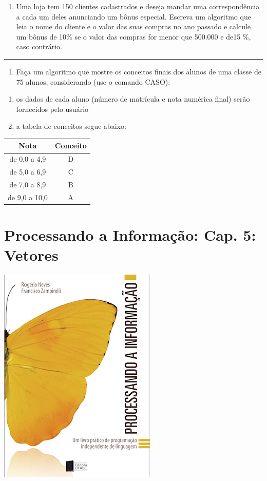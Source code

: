 \documentclass[12pt,a4paper]{article}
\providecommand{\tightlist}{%
      \setlength{\itemsep}{0pt}\setlength{\parskip}{0pt}}
\begin{document}
\begin{enumerate}
\def\labelenumi{\arabic{enumi}.}
\setcounter{enumi}{12}
\tightlist
\item
  Uma loja tem 150 clientes cadastrados e deseja mandar uma
  correspondência a cada um deles anunciando um bônus especial. Escreva
  um algoritmo que leia o nome do cliente e o valor das suas compras no
  ano passado e calcule um bônus de 10\% se o valor das compras for
  menor que 500.000 e de15 \%, caso contrário.
\end{enumerate}

    \begin{center}\rule{0.5\linewidth}{0.5pt}\end{center}

\begin{enumerate}
\def\labelenumi{\arabic{enumi}.}
\setcounter{enumi}{13}
\tightlist
\item
  Faça um algoritmo que mostre os conceitos finais dos alunos de uma
  classe de 75 alunos, considerando (use o comando CASO):
\end{enumerate}

\begin{enumerate}
\def\labelenumi{\alph{enumi})}
\item
  os dados de cada aluno (número de matrícula e nota numérica final)
  serão fornecidos pelo usuário
\item
  a tabela de conceitos segue abaixo:
\end{enumerate}

\begin{longtable}[]{@{}cc@{}}
\toprule
Nota & Conceito\tabularnewline
\midrule
\endhead
de 0,0 a 4,9 & D\tabularnewline
de 5,0 a 6,9 & C\tabularnewline
de 7,0 a 8,9 & B\tabularnewline
de 9,0 a 10,0 & A\tabularnewline
\bottomrule
\end{longtable}

    \hypertarget{processando-a-informauxe7uxe3o-cap.-5-vetores}{%
\section{Processando a Informação: Cap. 5:
Vetores}\label{processando-a-informauxe7uxe3o-cap.-5-vetores}}

    \includegraphics{"figs/Capa_Processando_Informacao.jpg"}
\end{document}
